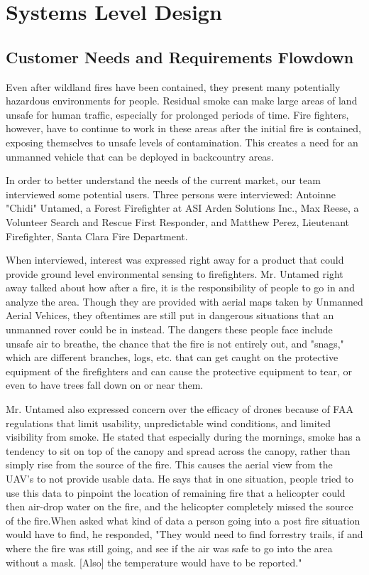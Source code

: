 \chapter{Systems Level Design}
\graphicspath{{images/}}
%
\section{Customer Needs and Requirements Flowdown}
Even after wildland fires have been contained, they present many potentially hazardous environments for people. Residual smoke can make large areas of land unsafe for human traffic, especially for prolonged periods of time. Fire fighters, however, have to continue to work in these areas after the initial fire is contained, exposing themselves to unsafe levels of contamination. This creates a need for an unmanned vehicle that can be deployed in backcountry areas. 

In order to better understand the needs of the current market, our team interviewed some potential users. Three persons were interviewed: Antoinne "Chidi" Untamed, a Forest Firefighter at ASI Arden Solutions Inc., Max Reese, a Volunteer Search and Rescue First Responder, and Matthew Perez, Lieutenant Firefighter, Santa Clara Fire Department. 

When interviewed, interest was expressed right away for a product that could provide ground level environmental sensing to firefighters. Mr. Untamed right away talked about how after a fire, it is the responsibility of people to go in and analyze the area. Though they are provided with aerial maps taken by Unmanned Aerial Vehices, they oftentimes are still put in dangerous situations that an unmanned rover could be in instead. The dangers these people face include unsafe air to breathe, the chance that the fire is not entirely out, and "snags," which are different branches, logs, etc. that can get caught on the protective equipment of the firefighters and can cause the protective equipment to tear, or even to have trees fall down on or near them. 

Mr. Untamed also expressed concern over the efficacy of drones because of FAA regulations that limit usability, unpredictable wind conditions, and limited visibility from smoke. He stated that especially during the mornings, smoke has a tendency to sit on top of the canopy and spread across the canopy, rather than simply rise from the source of the fire. This causes the aerial view from the UAV's to not provide usable data. He says that in one situation, people tried to use this data to pinpoint the location of remaining fire that a helicopter could then air-drop water on the fire, and the helicopter completely missed the source of the fire.When asked what kind of data a person going into a post fire situation would have to find, he responded, "They would need to find forrestry trails, if and where the fire was still going, and see if the air was safe to go into the area without a mask. [Also] the temperature would have to be reported." 

